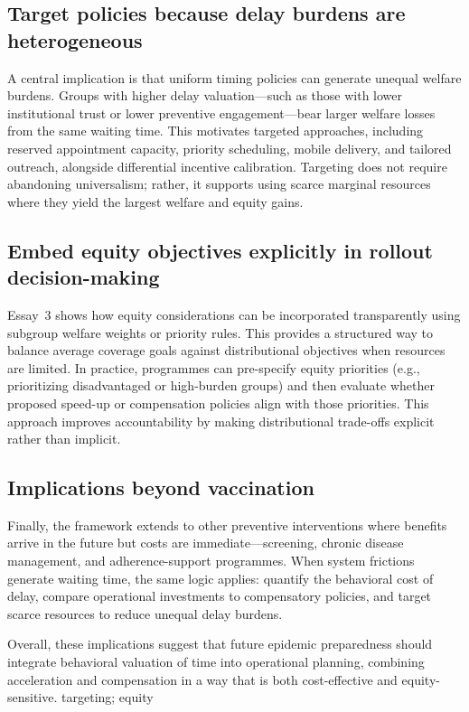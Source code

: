 \documentclass[doublespacing]{utdthesis}
\begin{document}
\subsection{Target policies because delay burdens are heterogeneous}
A central implication is that uniform timing policies can generate unequal welfare burdens. Groups with higher delay valuation—such as those with lower institutional trust or lower preventive engagement—bear larger welfare losses from the same waiting time. This motivates targeted approaches, including reserved appointment capacity, priority scheduling, mobile delivery, and tailored outreach, alongside differential incentive calibration. Targeting does not require abandoning universalism; rather, it supports using scarce marginal resources where they yield the largest welfare and equity gains.

\subsection{Embed equity objectives explicitly in rollout decision-making}
Essay~3 shows how equity considerations can be incorporated transparently using subgroup welfare weights or priority rules. This provides a structured way to balance average coverage goals against distributional objectives when resources are limited. In practice, programmes can pre-specify equity priorities (e.g., prioritizing disadvantaged or high-burden groups) and then evaluate whether proposed speed-up or compensation policies align with those priorities. This approach improves accountability by making distributional trade-offs explicit rather than implicit.

\subsection{Implications beyond vaccination}
Finally, the framework extends to other preventive interventions where benefits arrive in the future but costs are immediate—screening, chronic disease management, and adherence-support programmes. When system frictions generate waiting time, the same logic applies: quantify the behavioral cost of delay, compare operational investments to compensatory policies, and target scarce resources to reduce unequal delay burdens.

Overall, these implications suggest that future epidemic preparedness should integrate behavioral valuation of time into operational planning, combining acceleration and compensation in a way that is both cost-effective and equity-sensitive.
 targeting; equity
\end{document}
